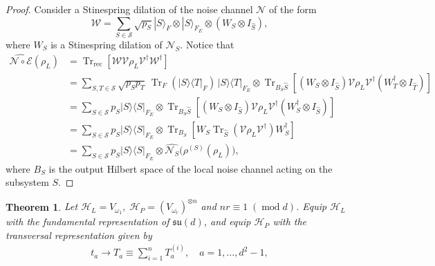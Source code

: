 \documentclass[10pt,twocolumn,superscriptaddress,aps,amsmath,amssymb,citeautoscript,floatfix,prx]{revtex4-2}
\theoremstyle{plain}
\theoremstyle{plain}
\theoremstyle{plain}
\theoremstyle{plain}
\theoremstyle{plain}
\theoremstyle{plain}
\theoremstyle{plain}
\newtheorem{smtheorem}{Theorem}[section]
\theoremstyle{definition}
\theoremstyle{plain}
\begin{document}
\begin{appendix}
\begin{proof}
    Consider a Stinespring dilation of the noise channel $\mathcal{N}$ of the form
    \[
        \mathcal{W}
        =
        \sum_{S\in\mathcal S}
        \sqrt{p_S}
        |S\rangle_F
        \otimes
        |S\rangle_{F_E}
        \otimes
        \left(W_S \otimes I_{\hat S}\right),
    \]
    where $W_S$ is a Stinespring dilation of $\mathcal{N}_S$. Notice that
\[
    \begin{aligned}
    \widehat{\mathcal{N}\circ\mathcal{E}}(\rho_L)
    &=
    \operatorname{Tr}_{\mathrm{rec}}
    \left[
    \mathcal W \mathcal{V}\rho_L\mathcal{V}^\dagger \mathcal W^\dagger
    \right]
    \\
    &=
    \sum_{S,T\in\mathcal S}
    \sqrt{p_Sp_T}\,
    \operatorname{Tr}_F(|S\rangle\langle T|_F)\,
    |S\rangle\langle T|_{F_E}
    \otimes
    \operatorname{Tr}_{B_S\hat S}
    \left[
    (W_S\otimes I_{\hat S})
    \mathcal{V}\rho_L\mathcal{V}^\dagger
    (W_T^\dagger\otimes I_{\hat T})
    \right]
    \\
    &=
    \sum_{S\in\mathcal S}
    p_S |S\rangle\langle S|_{F_E}
    \otimes
    \operatorname{Tr}_{B_S\hat S}
    \left[
    (W_S\otimes I_{\hat S})
    \mathcal{V}\rho_L\mathcal{V}^\dagger
    (W_S^\dagger\otimes I_{\hat S})
    \right]
    \\
    &=
    \sum_{S\in\mathcal S}
    p_S |S\rangle\langle S|_{F_E}
    \otimes
    \operatorname{Tr}_{B_S}
    \left[
    W_S
    \operatorname{Tr}_{\hat S}(\mathcal{V}\rho_L\mathcal{V}^\dagger)
    W_S^\dagger
    \right]
    \\
    &=
    \sum_{S\in\mathcal S}
    p_S |S\rangle\langle S|_{F_E}
    \otimes
    \widehat{\mathcal N_S}\bigl(\rho^{(S)}(\rho_L)\bigr),
    \end{aligned}
\]
where $B_S$ is the output Hilbert space of the local noise channel acting on the subsystem $S$.
\end{proof}
\begin{smtheorem}\label{thrm:sudscale_general}
            Let
$
    \mathcal H_L=V_{\omega_1},\;
    \mathcal H_P=(V_{\omega_r})^{\otimes n}
$
and $nr\equiv 1\;(\operatorname{mod} d)$.
Equip \(\mathcal H_L\) with the fundamental representation of
\(\mathfrak{su}(d)\), and equip \(\mathcal H_P\) with the transversal
representation given by
\begin{equation}\label{eq:global_generators}
\begin{gathered}
t_a \rightarrow T_a \equiv \sum_{i=1}^n T_a^{(i)}, \quad a=1,\ldots,d^2-1,
\end{gathered}

\end{equation}
\end{smtheorem}
\end{appendix}
\end{document}
